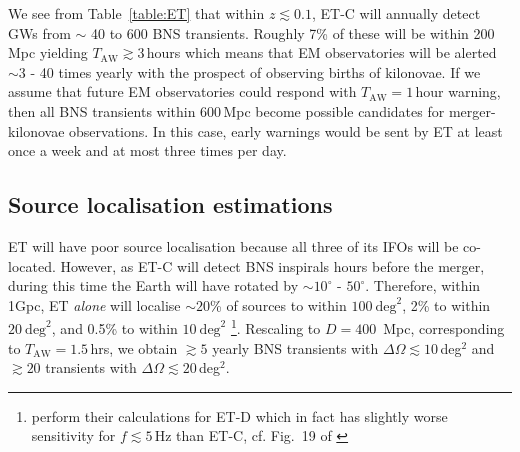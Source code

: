\documentclass{aa}
\begin{document}
We see from Table~\ref{table:ET} that %
within $z\lesssim 0.1$, %
ET-C will annually detect GWs from $\sim$ 40 to 600 BNS transients.
Roughly 7\% of these will be within 200\,Mpc yielding $T_\text{AW}\gtrsim 3\,$hours which means that EM observatories will be alerted $\sim 3$ - 40 times yearly with the prospect of observing births of kilonovae.
If we assume that future EM observatories could respond with $T_\text{AW}=1\,$hour warning, then
all BNS transients within 600\,Mpc become possible candidates for merger-kilonovae observations.
In this case, early warnings would be sent by ET at least once a week and at most three times per day.

\subsection{Source localisation estimations}
ET will have poor source localisation because all three of its IFOs will be co-located. 
However, as ET-C will
detect BNS inspirals hours before the merger, during this time the Earth will have rotated by $\sim 10^\circ$ - $50^\circ$.
Therefore, within 1Gpc, ET \emph{alone} will localise  $\sim20$\% of sources to within $100~\mathrm{deg}^2$, 
2\% to within $20~\mathrm{deg}^2$, and 0.5\% to within $10~\mathrm{deg}^2$ \citep{Zhao:2017cbb} 
\footnote{\cite{Zhao:2017cbb} perform their calculations for ET-D which in fact has slightly worse sensitivity for $f\lesssim 5\,$Hz than ET-C, cf. Fig.~19 of \cite{GW_IFO_LRR}}.
Rescaling to $D=400$~Mpc, corresponding to $T_\text{AW}= 1.5\,$hrs, we obtain $\gtrsim 5$ yearly BNS transients with $\Delta\Omega \lesssim 10\,$deg$^2$ and $\gtrsim20$ transients with $\Delta\Omega \lesssim 20\,$deg$^2$.
\end{document}

